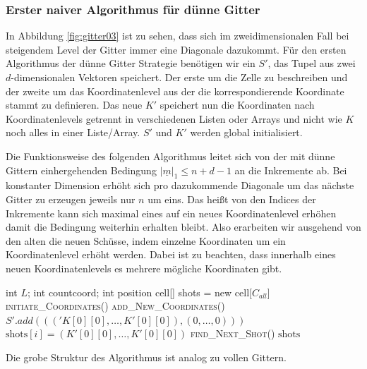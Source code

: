 \documentclass[a4paper,12pt]{llncs}
\numberwithin{equation}{section}
\begin{document}
\subsubsection{Erster naiver Algorithmus für dünne Gitter}

In Abbildung \ref{fig:gitter03} ist zu sehen, dass sich im zweidimensionalen Fall bei steigendem Level der Gitter immer eine Diagonale dazukommt. Für den ersten Algorithmus der dünne Gitter Strategie benötigen wir ein $S'$, das Tupel aus zwei $d$-dimensionalen Vektoren speichert. Der erste um die Zelle zu beschreiben und der zweite um das Koordinatenlevel aus der die korrespondierende Koordinate stammt zu definieren. Das neue $K'$ speichert nun die Koordinaten nach Koordinatenlevels getrennt in verschiedenen Listen oder Arrays und nicht wie $K$ noch alles in einer Liste/Array. $S'$ und $K'$ werden global initialisiert.

Die Funktionsweise des folgenden Algorithmus leitet sich von der mit dünne Gittern einhergehenden Bedingung $|\underline{m}|_1\leq n+d-1$ an die Inkremente ab. Bei konstanter Dimension erhöht sich pro dazukommende Diagonale um das nächste Gitter zu erzeugen jeweils nur $n$ um eins. Das heißt von den Indices der Inkremente kann sich maximal eines auf ein neues Koordinatenlevel erhöhen damit die Bedingung weiterhin erhalten bleibt. Also erarbeiten wir ausgehend von den alten die neuen Schüsse, indem einzelne Koordinaten um ein Koordinatenlevel erhöht werden. Dabei ist zu beachten, dass innerhalb eines neuen Koordinatenlevels es mehrere mögliche Koordinaten gibt. 


\begin{tcolorbox}
	\begin{algorithmic}
		\State int $L$; int countcoord; int position
		\State cell[] shots = new cell[$C_{all}$]
		\State \textsc{initiate\_Coordinates}()
		\EndIf
		\State \textsc{add\_New\_Coordinates}()
		\EndIf
		\State $S'.add((('K[0][0],\dots,K'[0][0]),(0,\dots,0)))$
		\State $\text{shots}[i] = (K'[0][0],\dots,K'[0][0])$
		\Else
		\State \textsc{find\_Next\_Shot}()
		\EndIf
		\EndFor
		\State \Return $\text{shots}$
		\EndFunction
	\end{algorithmic}
\end{tcolorbox}

Die grobe Struktur des Algorithmus ist analog zu vollen Gittern.
\end{document}
